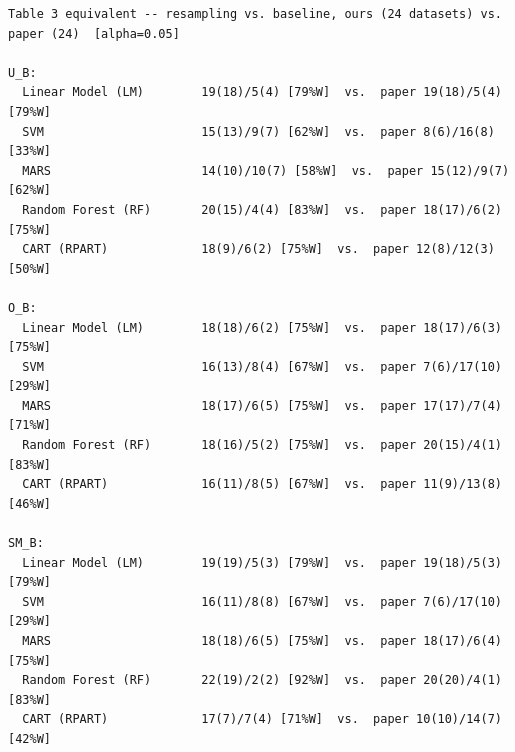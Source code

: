 \begingroup
{}
\label{tab:exp002_cmp_cmp_table3}
\scriptsize
\begin{verbatim}
Table 3 equivalent -- resampling vs. baseline, ours (24 datasets) vs. paper (24)  [alpha=0.05]

U_B:
  Linear Model (LM)        19(18)/5(4) [79%W]  vs.  paper 19(18)/5(4) [79%W]
  SVM                      15(13)/9(7) [62%W]  vs.  paper 8(6)/16(8) [33%W]
  MARS                     14(10)/10(7) [58%W]  vs.  paper 15(12)/9(7) [62%W]
  Random Forest (RF)       20(15)/4(4) [83%W]  vs.  paper 18(17)/6(2) [75%W]
  CART (RPART)             18(9)/6(2) [75%W]  vs.  paper 12(8)/12(3) [50%W]

O_B:
  Linear Model (LM)        18(18)/6(2) [75%W]  vs.  paper 18(17)/6(3) [75%W]
  SVM                      16(13)/8(4) [67%W]  vs.  paper 7(6)/17(10) [29%W]
  MARS                     18(17)/6(5) [75%W]  vs.  paper 17(17)/7(4) [71%W]
  Random Forest (RF)       18(16)/5(2) [75%W]  vs.  paper 20(15)/4(1) [83%W]
  CART (RPART)             16(11)/8(5) [67%W]  vs.  paper 11(9)/13(8) [46%W]

SM_B:
  Linear Model (LM)        19(19)/5(3) [79%W]  vs.  paper 19(18)/5(3) [79%W]
  SVM                      16(11)/8(8) [67%W]  vs.  paper 7(6)/17(10) [29%W]
  MARS                     18(18)/6(5) [75%W]  vs.  paper 18(17)/6(4) [75%W]
  Random Forest (RF)       22(19)/2(2) [92%W]  vs.  paper 20(20)/4(1) [83%W]
  CART (RPART)             17(7)/7(4) [71%W]  vs.  paper 10(10)/14(7) [42%W]

\end{verbatim}
\endgroup
